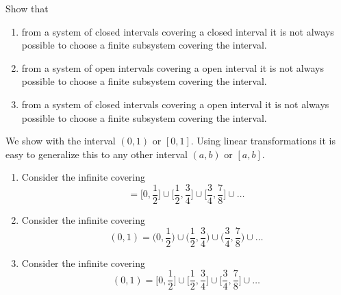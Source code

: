   \begin{exercise}[Zorich 2.3.2]
    Show that 
    \begin{enumerate}
      \item from a system of closed intervals covering a closed interval it is not always possible to choose a finite subsystem covering the interval. 
      \item from a system of open intervals covering a open interval it is not always possible to choose a finite subsystem covering the interval. 
      \item from a system of closed intervals covering a open interval it is not always possible to choose a finite subsystem covering the interval. 
    \end{enumerate}
  \end{exercise}
  \begin{solution}
    We show with the interval $(0, 1)$ or $[0, 1]$. Using linear transformations it is easy to generalize this to any other interval $(a, b)$ or $[a, b]$. 
    \begin{enumerate}
      \item Consider the infinite covering
      \begin{equation}
        [0, 1] = \big[0, \frac{1}{2}\big] \cup \big[\frac{1}{2}, \frac{3}{4}\big] \cup \big[\frac{3}{4}, \frac{7}{8}\big] \cup \ldots
      \end{equation}
      \item Consider the infinite covering 
      \begin{equation}
        (0, 1) = \big(0, \frac{1}{2}\big) \cup \big(\frac{1}{2}, \frac{3}{4}\big) \cup \big(\frac{3}{4}, \frac{7}{8}\big) \cup \ldots
      \end{equation}
      \item Consider the infinite covering 
      \begin{equation}
        (0, 1) = \big[0, \frac{1}{2}\big] \cup \big[\frac{1}{2}, \frac{3}{4}\big] \cup \big[\frac{3}{4}, \frac{7}{8}\big] \cup \ldots
      \end{equation}
    \end{enumerate}
  \end{solution}

